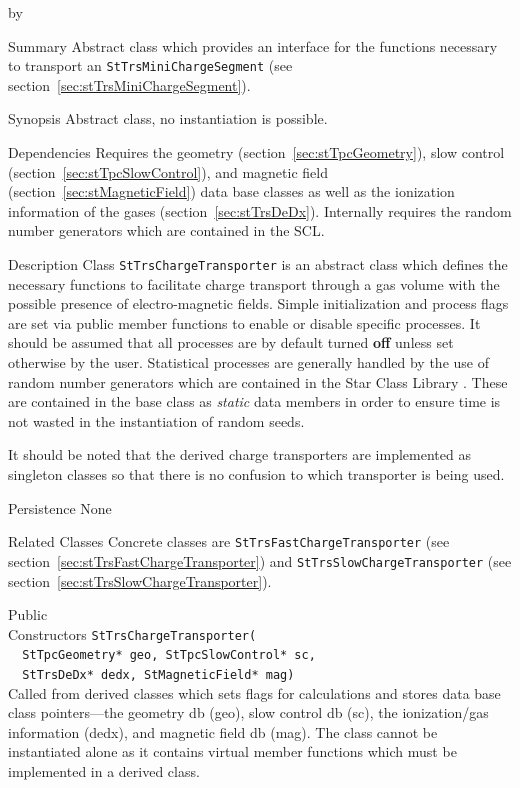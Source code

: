 \documentclass[twoside]{article}
\newcommand{\comp}[1]{\texttt{#1}}%
\newcommand{\entrylabel}[1]{\mbox{\textbf{{#1}}}\hfil}%
\newenvironment{entry}
{\begin{list}{}%
    {\renewcommand{\makelabel}{\entrylabel}%
     \setlength{\labelwidth}{90pt}%
     \setlength{\leftmargin}{\labelwidth}
     \advance\leftmargin by \labelsep%
      }%
    }%
  {\end{list}}
\newcommand{\Entrylabel}[1]%
{\raisebox{0pt}[1ex][0pt]{\makebox[\labelwidth][l]%
    {\parbox[t]{\labelwidth}{\hspace{0pt}\textbf{{#1}}}}}}
\newenvironment{Entry}%
{\renewcommand{\entrylabel}{\Entrylabel}\begin{entry}}%
  {\end{entry}}
\begin{document}
\begin{Entry}
\item[Summary]
  Abstract class which provides an interface for the functions necessary 
  to transport an \comp{StTrsMiniChargeSegment} (see 
  section~\ref{sec:stTrsMiniChargeSegment}). 
    
\item[Synopsis]
   Abstract class, no instantiation is possible.

\item[Dependencies]
   Requires the geometry (section~\ref{sec:stTpcGeometry}),
   slow control (section~\ref{sec:stTpcSlowControl}), and
   magnetic field (section~\ref{sec:stMagneticField}) data base
   classes as well as the ionization information of the gases
   (section~\ref{sec:stTrsDeDx}).  Internally requires the random
   number generators which are contained in the SCL. 

\item[Description]
Class \comp{StTrsChargeTransporter} is an abstract class which defines
the necessary functions to facilitate charge transport through 
a gas volume with the possible presence of electro-magnetic fields.
Simple initialization and process flags are set via public member
functions to enable or disable specific processes.  It should be
assumed that all processes are by default turned {\bf off} unless
set otherwise by the user.  Statistical processes are generally 
handled by the use of random number generators which are contained
in the Star Class Library .  These are contained in the
base class as {\em static} data members in order to ensure time is not
wasted in the instantiation of random seeds.

It should be noted that the derived charge transporters are implemented
as singleton classes so that there is no confusion to which transporter
is being used. 

\item[Persistence]
   None

\item[Related Classes]
   Concrete  classes are \comp{StTrsFastChargeTransporter} (see 
   section~\ref{sec:stTrsFastChargeTransporter}) and
   \comp{StTrsSlowChargeTransporter} (see 
   section~\ref{sec:stTrsSlowChargeTransporter}).  

\item[Public \\ Constructors]
   \verb+StTrsChargeTransporter(+\\
   \verb+  StTpcGeometry* geo, StTpcSlowControl* sc,+\\
   \verb+  StTrsDeDx* dedx, StMagneticField* mag)+\\
   Called from derived classes which sets flags for calculations and
   stores data base class pointers---the geometry db (geo), 
   slow control db (sc), the 
   ionization/gas information (dedx), and magnetic field db (mag).
   The class cannot be instantiated alone as it contains virtual 
   member functions which must be implemented
   in a derived class.


\end{Entry}
\end{document}
